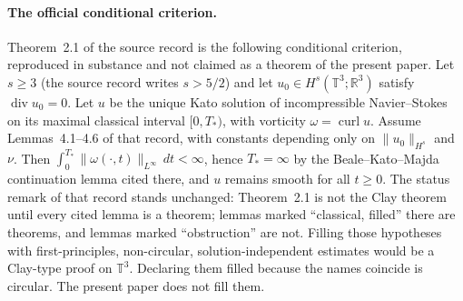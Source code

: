\documentclass[11pt,a4paper]{article}
\theoremstyle{definition}
\theoremstyle{remark}
\newcommand{\R}{\mathbb{R}}
\newcommand{\T}{\mathbb{T}}
\begin{document}
\paragraph{The official conditional criterion.}
Theorem~2.1 of the source record is the following conditional criterion, reproduced in substance and not claimed as a theorem of the present paper. Let $s\ge 3$ (the source record writes $s>5/2$) and let $u_0\in H^s(\T^3;\R^3)$ satisfy $\operatorname{div}u_0=0$. Let $u$ be the unique Kato solution of incompressible Navier--Stokes on its maximal classical interval $[0,T_\ast)$, with vorticity $\omega=\operatorname{curl}u$. Assume Lemmas~4.1--4.6 of that record, with constants depending only on $\|u_0\|_{H^s}$ and $\nu$. Then $\int_0^{T_\ast}\|\omega(\cdot,t)\|_{L^\infty}\,dt<\infty$, hence $T_\ast=\infty$ by the Beale--Kato--Majda continuation lemma cited there, and $u$ remains smooth for all $t\ge 0$. The status remark of that record stands unchanged: Theorem~2.1 is not the Clay theorem until every cited lemma is a theorem; lemmas marked ``classical, filled'' there are theorems, and lemmas marked ``obstruction'' are not. Filling those hypotheses with first-principles, non-circular, solution-independent estimates would be a Clay-type proof on $\T^3$. Declaring them filled because the names coincide is circular. The present paper does not fill them.
\end{document}
